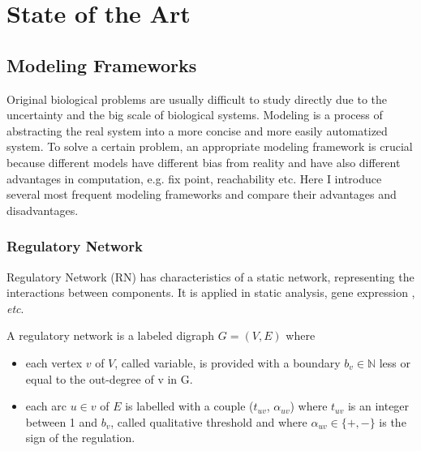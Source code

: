 \chapter{State of the Art}\label{chap:stateOfTheArt}

\section{Modeling Frameworks}
Original biological problems are usually difficult to study directly due to the uncertainty and the big scale of biological systems. 
Modeling is a process of abstracting the real system into a more concise and more easily automatized system.
To solve a certain problem, an appropriate modeling framework is crucial because different models have different bias from reality and have also different advantages in computation, e.g. fix point, reachability etc.
Here I introduce several most frequent modeling frameworks and compare their advantages and disadvantages.

\subsection{Regulatory Network}\label{sec:regNetwork}
Regulatory Network (RN) has characteristics of a static network, representing the interactions between components.
It is applied in static analysis, gene expression \cite{shinozaki2003regulatory}, \textit{etc}.

\begin{definition}\label{def:RN}
A regulatory network is a labeled digraph $G=(V,E)$ where 
\begin{itemize}
    \item each vertex $v$ of $V$, called variable, is provided with a boundary $b_v\in \mathbb{N}$ less or equal to the out-degree of v in G.
    \item each arc $u\in v$ of $E$ is labelled with a couple ($t_{uv}$, $\alpha_{uv}$) where $t_{uv}$ is an integer between 1 and $b_v$, called qualitative threshold and where $\alpha_{uv}\in \{+,-\}$ is the sign of the regulation.
\end{itemize}
\end{definition}

